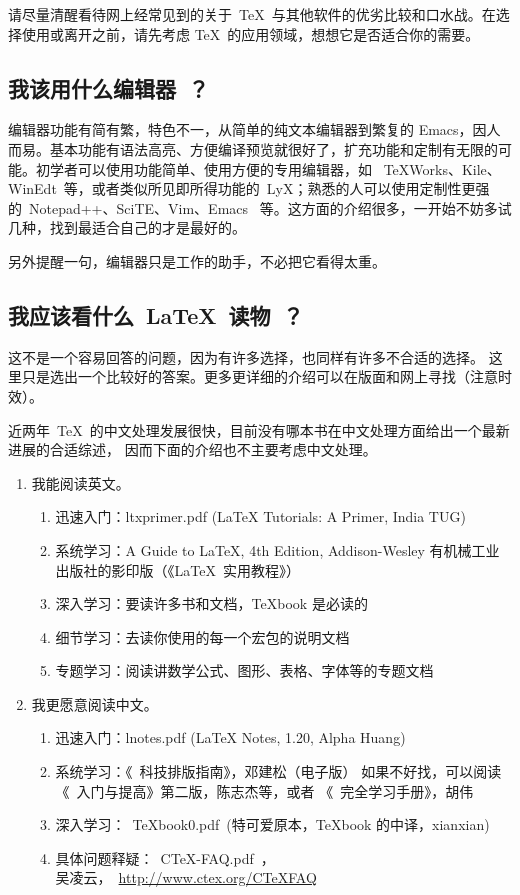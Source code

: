 请尽量清醒看待网上经常见到的关于~\TeX~与其他软件的优劣比较和口水战。在选择使用或离开之前，请先考虑
\TeX~的应用领域，想想它是否适合你的需要。


\subsection{我该用什么编辑器~？}

编辑器功能有简有繁，特色不一，从简单的纯文本编辑器到繁复的 Emacs，因人而易。基本功能有语法高亮、方便编译预览就很好了，扩充功能和定制有无限的可能。初学者可以使用功能简单、使用方便的专用编辑器，如 ~TeXWorks、Kile、WinEdt~等，或者类似所见即所得功能的~LyX；熟悉的人可以使用定制性更强的~Notepad++、SciTE、Vim、Emacs ~等。这方面的介绍很多，一开始不妨多试几种，找到最适合自己的才是最好的。

另外提醒一句，编辑器只是工作的助手，不必把它看得太重。

\subsection{我应该看什么~\LaTeX~读物~？}

这不是一个容易回答的问题，因为有许多选择，也同样有许多不合适的选择。\cite{beard1980measuring}
这里只是选出一个比较好的答案。更多更详细的介绍可以在版面和网上寻找（注意时效）。

近两年~\TeX~的中文处理发展很快，目前没有哪本书在中文处理方面给出一个最新进展的合适综述，
因而下面的介绍也不主要考虑中文处理。

\begin{enumerate}

\item 我能阅读英文。
\begin{enumerate}
\item 迅速入门：ltxprimer.pdf (LaTeX Tutorials: A Primer, India TUG)
\item 系统学习：A Guide to LaTeX, 4th Edition, Addison-Wesley
               有机械工业出版社的影印版（《\LaTeX{}~实用教程》）
\item 深入学习：要读许多书和文档，TeXbook 是必读的
\item 细节学习：去读你使用的每一个宏包的说明文档
\item 专题学习：阅读讲数学公式、图形、表格、字体等的专题文档
\end{enumerate}

\item 我更愿意阅读中文。
\begin{enumerate}
\item 迅速入门：lnotes.pdf (LaTeX Notes, 1.20, Alpha Huang)
\item 系统学习：《\LaTeXe{}~科技排版指南》，邓建松（电子版）
      如果不好找，可以阅读《\LaTeXe~入门与提高》第二版，陈志杰等，或者 《\LaTeXe~完全学习手册》，胡伟
\item 深入学习：~TeXbook0.pdf~(特可爱原本，TeXbook 的中译，xianxian)
\item 具体问题释疑：~CTeX-FAQ.pdf~，\\
        吴凌云，~\url{http://www.ctex.org/CTeXFAQ}~
\end{enumerate}
\end{enumerate}

